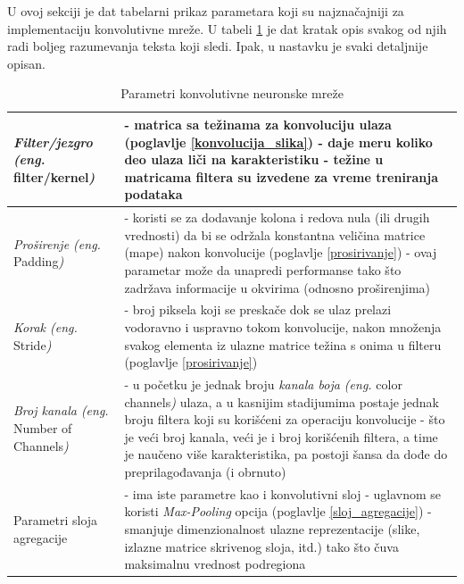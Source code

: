 \documentclass[a4paper]{article}
\begin{document}
U ovoj sekciji je dat tabelarni prikaz parametara koji su najznačajniji za implementaciju konvolutivne mreže. U tabeli \ref{tabela_parametri} je dat kratak opis svakog od njih radi boljeg razumevanja teksta koji sledi. Ipak, u nastavku je svaki detaljnije opisan.

\begin{table}[h!]
\begin{center}
\caption{Parametri konvolutivne neuronske mreže}
\begin{tabular}{|l|p{60mm}|}
\hline
\textit{Filter/jezgro (eng.} filter/kernel\textit{)} &
- matrica sa težinama za konvoluciju ulaza (poglavlje \ref{konvolucija_slika}) \newline
- daje meru koliko deo ulaza liči na karakteristiku \newline
- težine u matricama filtera su izvedene za vreme treniranja podataka
\\
\hline
\textit{Proširenje (eng.} Padding\textit{)} &
- koristi se za dodavanje kolona i redova nula (ili drugih vrednosti) da bi se održala konstantna veličina matrice (mape) nakon konvolucije (poglavlje \ref{prosirivanje}) \newline
- ovaj parametar može da unapredi performanse tako što zadržava informacije u okvirima (odnosno proširenjima)
\\
\hline 
\textit{Korak (eng.} Stride\textit{)} &
- broj piksela koji se preskače dok se ulaz prelazi vodoravno i uspravno tokom konvolucije, nakon množenja svakog elementa iz ulazne matrice težina s onima u filteru (poglavlje \ref{prosirivanje})
\\
\hline 
\textit{Broj kanala (eng.} Number of Channels\textit{)} &
- u početku je jednak broju \textit{kanala boja (eng.} color channels\textit{)} ulaza, a u kasnijim stadijumima postaje jednak broju filtera koji su korišćeni za operaciju konvolucije \newline
- što je veći broj kanala, veći je i broj korišćenih filtera, a time je naučeno više karakteristika, pa postoji šansa da dođe do preprilagođavanja (i obrnuto)
\\
\hline 
Parametri sloja agregacije &
- ima iste parametre kao i konvolutivni sloj \newline
- uglavnom se koristi \textit{Max-Pooling} opcija (poglavlje \ref{sloj_agregacije}) \newline
- smanjuje dimenzionalnost ulazne reprezentacije (slike, izlazne matrice skrivenog sloja, itd.) tako što čuva maksimalnu vrednost podregiona
\\
\hline 
\end{tabular}
\label{tabela_parametri}
\end{center}
\end{table}
\end{document}
